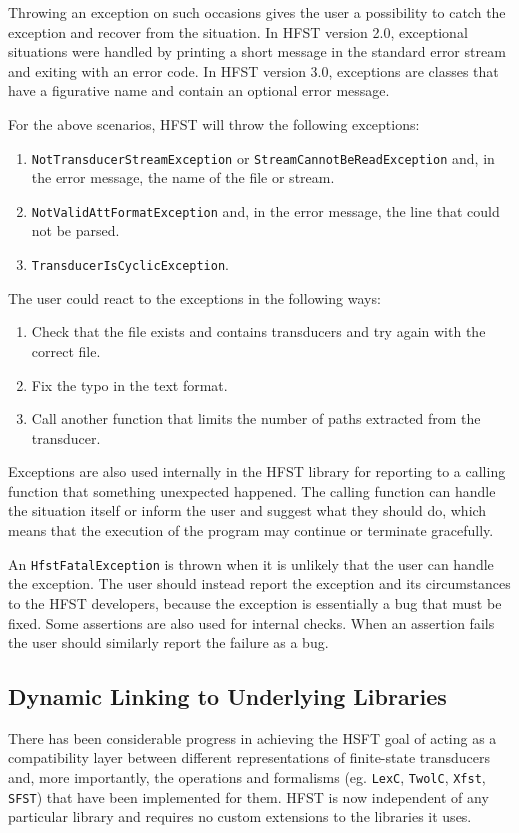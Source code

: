 \documentclass{llncs}
\begin{document}
Throwing an exception on such occasions gives the user a possibility
to catch the exception and recover from the situation. In HFST version
2.0, exceptional situations were handled by printing a short message
in the standard error stream and exiting with an error code. In HFST version 3.0, 
exceptions are classes that have a figurative name and contain an 
optional error message.

For the above scenarios, HFST will throw the following exceptions:

\begin{enumerate} 
\item \texttt{NotTransducerStreamException} or 
\texttt{StreamCannotBeReadException} and, in the error message,
the name of the file or stream.
\item \texttt{NotValidAttFormatException} and, in the error message, 
the line that could not be parsed.
\item \texttt{TransducerIsCyclicException}.
\end{enumerate} 

The user could react to the exceptions in the following ways:

\begin{enumerate} 
\item Check that the file exists and contains transducers and try again
with the correct file.
\item Fix the typo in the text format.
\item Call another function that limits the number of paths extracted
from the transducer.
\end{enumerate} 

Exceptions are also used internally in the HFST library for reporting to a 
calling function that something unexpected happened. The calling
function can handle the situation itself or inform the user and suggest
what they should do, which means that the execution of the program 
may continue or terminate gracefully.

An \texttt{HfstFatalException} is thrown when it is unlikely that the user
can handle the exception. The user should instead report the exception
and its circumstances to the HFST developers, because the exception
is essentially a bug that must be fixed. Some assertions are also
used for internal checks. When an assertion fails the user should similarly
report the failure as a bug.

\subsection{Dynamic Linking to Underlying Libraries}
There has been considerable progress in achieving the HSFT goal of acting as a
compatibility layer between different representations of finite-state
transducers and, more importantly, the operations and formalisms (eg.
\verb+LexC+, \verb+TwolC+, \verb+Xfst+, \verb+SFST+) that have been implemented
for them. HFST is now independent of any particular library and requires no
custom extensions to the libraries it uses.
\end{document}
